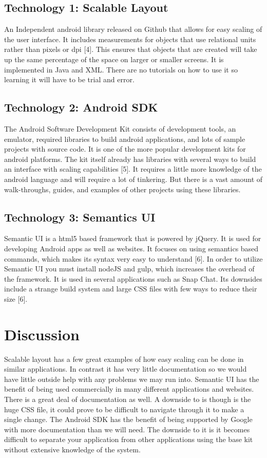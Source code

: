\documentclass{scrreprt}
\begin{document}
\subsection{Technology 1: Scalable Layout}
An Independent android library released on Github that allows for easy scaling of the user interface. It includes measurements for objects that use relational units rather than pixels or dpi [4]. This ensures that objects that are created will take up the same percentage of the space on larger or smaller screens. It is implemented in Java and XML. There are no tutorials on how to use it so learning it will have to be trial and error. 
\subsection{Technology 2: Android SDK}
The Android Software Development Kit consists of development tools, an emulator, required libraries to build android applications, and lots of sample projects with source code. It is one of the more popular development kits for android platforms. The kit itself already has libraries with several ways to build an interface with scaling capabilities [5]. It requires a little more knowledge of the android language and will require a lot of tinkering. But there is a vast amount of walk-throughs, guides, and examples of other projects using these libraries.
\subsection{Technology 3: Semantics UI}
Semantic UI is a html5 based framework that is powered by jQuery. It is used for developing Android apps as well as websites. It focuses on using semantics based commands, which makes its syntax very easy to understand [6]. In order to utilize Semantic UI you must install nodeJS and gulp, which increases the overhead of the framework. It is used in several applications such as Snap Chat. Its downsides include a strange build system and large CSS files with few ways to reduce their size [6].

\section{Discussion}
Scalable layout has a few great examples of how easy scaling can be done in similar applications. In contrast it has very little documentation so we would have little outside help with any problems we may run into. Semantic UI has the benefit of being used commercially in many different applications and websites. There is a great deal of documentation as well. A downside to is though is the huge CSS file, it could prove to be difficult to navigate through it to make a single change. The Android SDK has the benefit of being supported by Google with more documentation than we will need. The downside to it is it becomes difficult to separate your application from other applications using the base kit without extensive knowledge of the system.
\end{document}

